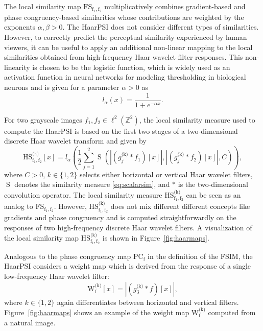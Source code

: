 \documentclass[11pt,a4paper]{article}
\newcommand{\bZ}{\mathbb{Z}}
\newcommand{\abs}[1]{\left\vert#1\right\vert}
\newcommand{\Sim}{\operatorname{S}}
\begin{document}
The local similarity map $\operatorname{FS_{f_1,f_2}}$ multiplicatively combines gradient-based and phase congruency-based similarities whose contributions are weighted by the exponents $\alpha,\beta>0$. The HaarPSI does not consider different types of similarities. However, to correctly predict the perceptual similarity experienced by human viewers, it can be useful to apply an additional non-linear mapping to the local similarities obtained from high-frequency Haar wavelet filter responses. This non-linearity is chosen to be the logistic function, which is widely used as an activation function in neural networks {for modeling thresholding in biological neurons}  and {is} given for a parameter $\alpha >0$ as
\begin{equation}
 \label{eq:logistic}
 l_\alpha(x) = \frac{1}{1 + e^{-\alpha x}}.
\end{equation}

For two grayscale images $f_1,f_2\in\ell^2(\bZ^2)$, the local similarity measure used to compute the HaarPSI is based on the first two stages of a two-dimensional discrete Haar wavelet transform and given by
\begin{equation}
\label{eq:localhs}
\operatorname{HS^\text{(k)}_{f_1,f_2}}[x]=l_\alpha\left(\frac{1}{2}\sum_{j= 1}^2\Sim\left(\abs{(g^\text{(k)}_j*f_1)[x]},\abs{(g^\text{(k)}_j*f_2)[x]},C\right)\right), 
\end{equation}
where $C > 0$, $k\in\{1,2\}$ selects either horizontal or vertical Haar wavelet filters, $\Sim$ denotes the similarity measure \eqref{eq:scalarsim}, and $*$ is the two-dimensional convolution operator. The local similarity measure $\operatorname{HS^\text{(k)}_{f_1,f_2}}$ can be seen as an analog to $\operatorname{FS_{f_1,f_2}}$. However, $\operatorname{HS^\text{(k)}_{f_1,f_2}}$ does not mix different different concepts like gradients and phase congruency and is computed straightforwardly on the responses of two high-frequency discrete Haar wavelet filters. A visualization of the local similarity map $\operatorname{HS^\text{(k)}_{f_1,f_2}}$ is shown in Figure~\ref{fig:haarmaps}.


Analogous to the phase congruency map $\operatorname{PC_{f}}$ in the definition of the FSIM, the HaarPSI considers a weight map which is derived from the response of a single low-frequency Haar wavelet filter:
\begin{equation}
\label{eq:haarweight}
\operatorname{W^\text{(k)}_{f}}[x] = \abs{(g^{\text{(k)}}_3*f)[x]},
\end{equation}
where $k\in\{1,2\}$ again differentiates between horizontal and vertical filters. Figure~\ref{fig:haarmaps} shows an example of the weight map $\operatorname{W^\text{(k)}_{f}}$ computed from a natural image.
\end{document}
